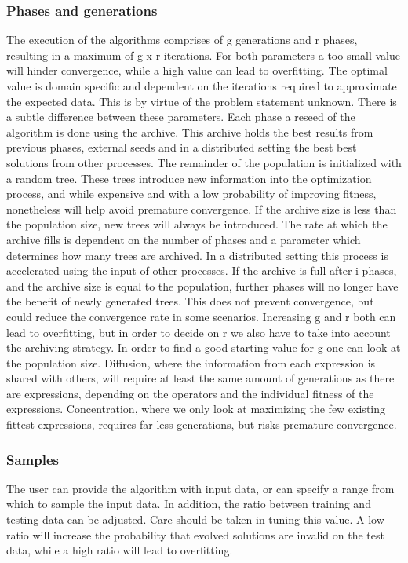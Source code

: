 \subsubsection{Phases and generations}
The execution of the algorithms comprises of g generations and r phases, resulting in a maximum of g x r iterations. 
For both parameters a too small value will hinder convergence, while a high value can lead to overfitting. The optimal value is domain specific and dependent on the iterations required to approximate the expected data. This is by virtue of the problem statement unknown. There is a subtle difference between these parameters. 
Each phase a reseed of the algorithm is done using the archive. This archive holds the best results from previous phases, external seeds and in a distributed setting the best best solutions from other processes.
The remainder of the population is initialized with a random tree. These trees introduce new information into the optimization process, and while expensive and with a low probability of improving fitness, nonetheless will help avoid premature convergence. 
If the archive size is less than the population size, new trees will always be introduced. The rate at which the archive fills is dependent on the number of phases and a parameter which determines how many trees are archived. In a distributed setting this process is accelerated using the input of other processes. If the archive is full after i phases, and the archive size is equal to the population, further phases will no longer have the benefit of newly generated trees. This does not prevent convergence, but could reduce the convergence rate in some scenarios. Increasing g and r both can lead to overfitting, but in order to decide on r we also have to take into account the archiving strategy. In order to find a good starting value for g one can look at the population size. 
Diffusion, where the information from each expression is shared with others, will require at least the same amount of generations as there are expressions, depending on the operators and the individual fitness of the expressions. Concentration, where we only look at maximizing the few existing fittest expressions, requires far less generations, but risks premature convergence.
\subsubsection{Samples}
The user can provide the algorithm with input data, or can specify a range from which to sample the input data. In addition, the ratio between training and testing data can be adjusted. Care should be taken in tuning this value. A low ratio will increase the probability that evolved solutions are invalid on the test data, while a high ratio will lead to overfitting.

